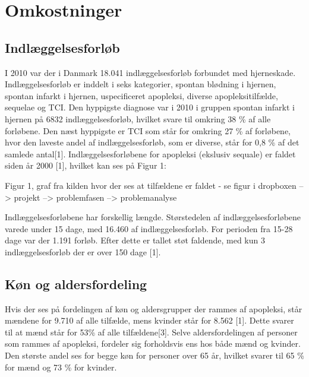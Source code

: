 \section{Omkostninger}
\subsection{Indlæggelsesforløb}
I 2010 var der i Danmark 18.041 indlæggelsesforløb forbundet med hjerneskade.  
Indlæggelsesforløb er inddelt i seks kategorier, spontan blødning i hjernen, spontan infarkt i hjernen, uspecificeret apopleksi, diverse apopleksitilfælde, sequelae og TCI.  Den hyppigste diagnose var i 2010 i gruppen spontan infarkt i hjernen på 6832 indlæggelsesforløb, hvilket svare til omkring 38 \% af alle forløbene. Den næst hyppigste er TCI som står for omkring 27 \% af forløbene, hvor den laveste andel af indlæggelsesforløb, som er diverse, står for 0,8 \% af det samlede antal[1]. 
Indlæggelsesforløbene for apopleksi (ekslusiv sequale) er faldet siden år 2000 [1], hvilket kan ses på Figur 1: %

Figur 1, graf fra kilden hvor der ses at tilfældene er faldet  - se figur i dropboxen --> projekt --> problemfasen --> problemanalyse

Indlæggelsesforløbene har forskellig længde. Størstedelen af indlæggelsesforløbene varede under 15 dage, med 16.460 af indlæggelsesforløb. For perioden fra 15-28 dage var der 1.191 forløb. Efter dette er tallet støt faldende, med kun 3 indlæggelsesforløb der er over 150 dage [1].

\subsection{Køn og aldersfordeling}
Hvis der ses på fordelingen af køn og aldersgrupper der rammes af apopleksi, står mændene for 9.710 af alle tilfælde, mens kvinder står for 8.562 [1]. Dette svarer til at mænd står for 53\% af alle tilfældene[3]. Selve aldersfordelingen af personer som rammes af apopleksi, fordeler sig forholdsvis ens hos både mænd og kvinder. Den største andel ses for begge køn for personer over 65 år, hvilket svarer til 65 \% for mænd og  73 \% for kvinder.

